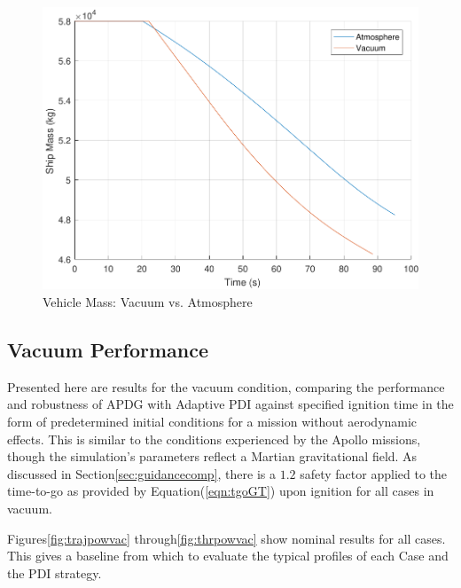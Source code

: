 \begin{figure}[H]
	\centering
	\begin{minipage}{4.3 in}
		\includegraphics[width=\linewidth]{Figures/massatmovsvac.pdf}
		\caption{Vehicle Mass: Vacuum vs. Atmosphere \label{fig:massatmovsvac} }
	\end{minipage}
\end{figure}



\subsection{Vacuum Performance} \label{sec:vacperf}

Presented here are results for the vacuum condition, comparing the performance and robustness of APDG with Adaptive PDI against specified ignition time in the form of predetermined initial conditions for a mission without aerodynamic effects. This is similar to the conditions experienced by the Apollo missions, though the simulation's parameters reflect a Martian gravitational field. As discussed in Section\:\ref{sec:guidancecomp}, there is a $1.2$ safety factor applied to the time-to-go as provided by Equation\:(\ref{eqn:tgoGT}) upon ignition for all cases in vacuum.

Figures\:\ref{fig:trajpowvac} through\:\ref{fig:thrpowvac} show nominal results for all cases. This gives a baseline from which to evaluate the typical profiles of each Case and the PDI strategy. 

